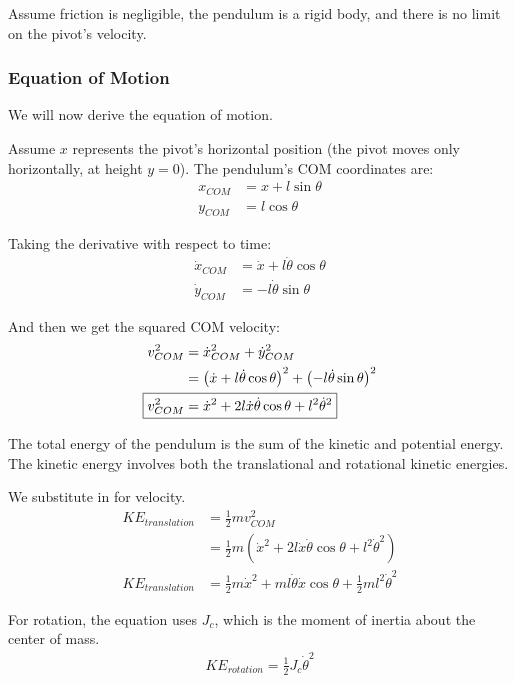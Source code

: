 \documentclass{article}
\begin{document}
Assume friction is negligible, the pendulum is a rigid body, and there is no limit on the pivot's velocity.

\subsubsection{Equation of Motion}
We will now derive the equation of motion.

Assume $x$ represents the pivot's horizontal position (the pivot moves only horizontally, at height $y = 0$). The pendulum's COM coordinates are:
\begin{align*}
    x_{COM} &= x + l\sin{\theta} \\
    y_{COM} &= l\cos{\theta}
\end{align*}

Taking the derivative with respect to time:
\begin{align*}
    \dot{x}_{COM} &= \dot{x} + l\dot{\theta}\cos{\theta} \\
    \dot{y}_{COM} &= -l\dot{\theta}\sin{\theta}
\end{align*}

And then we get the squared COM velocity:
\begin{align*}
    v_{COM}^2 &= \dot{x}_{COM}^2 + \dot{y}_{COM}^2 \\
    &= \left(\dot{x} + l\dot{\theta}\cos{\theta}\right)^2 + \left(-l\dot{\theta}\sin{\theta}\right)^2 \\
    \Aboxed{v_{COM}^2 &= \dot{x}^2 + 2l\dot{x}\dot{\theta}\cos{\theta} + l^2\dot{\theta}^2}
\end{align*}

The total energy of the pendulum is the sum of the kinetic and potential energy. The kinetic energy involves both the translational and rotational kinetic energies.

We substitute in for velocity.
\begin{align*}
    KE_{translation} &= \frac{1}{2}mv_{COM}^2 \\
    &= \frac{1}{2}m \left(\dot{x}^2 + 2l\dot{x}\dot{\theta}\cos{\theta} + l^2\dot{\theta}^2\right) \\
    KE_{translation} &= \frac{1}{2}m\dot{x}^2 + ml\dot{\theta}\dot{x}\cos{\theta} + \frac{1}{2}ml^2\dot{\theta}^2
\end{align*}

For rotation, the equation uses $J_c$, which is the moment of inertia about the center of mass.
\begin{align*}
    KE_{rotation} = \frac{1}{2}J_c\dot{\theta}^2
\end{align*}
\end{document}
